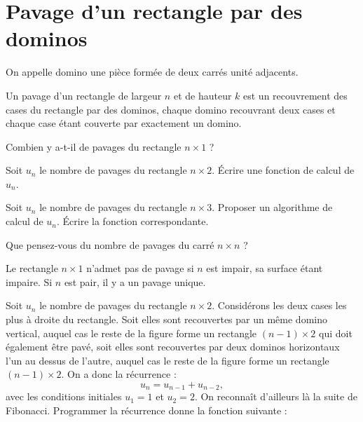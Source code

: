 \renewcommand{\SourceFile}{6-geometrie-et-images/src/6-1.ml}

\section{Pavage d'un rectangle par des dominos}

On appelle domino une pièce formée de deux carrés unité adjacents.
\medskip

\medskip

Un pavage d'un rectangle de largeur $n$ et de hauteur $k$ est un recouvrement des cases du rectangle par des dominos, chaque domino recouvrant deux cases et chaque case étant couverte par exactement un domino.

\Q
Combien y a-t-il de pavages du rectangle $n \times 1$ ?

\Q
Soit $u_n$ le nombre de pavages du rectangle $n \times 2$. Écrire une fonction de calcul de $u_n$.

\Q
Soit $u_n$ le nombre de pavages du rectangle $n \times 3$. Proposer un algorithme de calcul de $u_n$. Écrire la fonction correspondante.

\Q
Que pensez-vous du nombre de pavages du carré $n \times n$ ?

\Corrige

\Q
Le rectangle $n \times 1$ n'admet pas de pavage si $n$ est impair, sa surface étant impaire. Si $n$ est pair, il y a un pavage unique.

\Q
Soit $u_n$ le nombre de pavages du rectangle $n \times 2$. Considérons les deux cases les plus à droite du rectangle. Soit elles sont recouvertes par un même domino vertical, auquel cas le reste de la figure forme un rectangle $(n-1) \times 2$ qui doit également être pavé, soit elles sont recouvertes par deux dominos horizontaux l'un au dessus de l'autre, auquel cas le reste de la figure forme un rectangle $(n-1) \times 2$. On a donc la récurrence :
\[
    u_n = u_{n-1} + u_{n-2},
\]
avec les conditions initiales $u_1=1$ et $u_2=2$. On reconnaît d'ailleurs là la suite de Fibonacci. Programmer la récurrence donne la fonction suivante :



